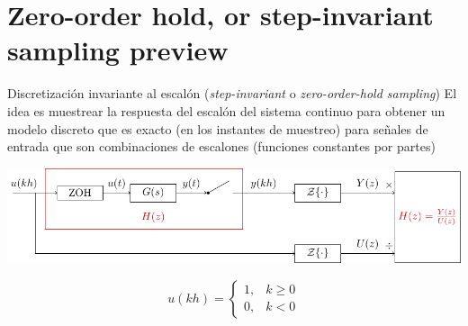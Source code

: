 \documentclass[presentation,aspectratio=169]{beamer}
\begin{document}
\section{Zero-order hold, or step-invariant sampling preview}
\label{sec:org598e7fb}
\begin{frame}[label={sec:org6eedb7e}]{Discretización invariante al escalón (\emph{step-invariant} o \emph{zero-order-hold sampling})}
El idea es muestrear la respuesta del escalón del sistema continuo para obtener un modelo discreto que es \alert{exacto} (en los instantes de muestreo) para señales de entrada que son combinaciones de escalones (funciones constantes por partes)

\begin{center}
\includegraphics[width=0.99\linewidth]{../../figures/invariant-sampling.pdf}
\end{center}

\[ u(kh) = \begin{cases} 1, & k \ge 0\\0, & k<0 \end{cases} \]
\end{frame}
\end{document}
